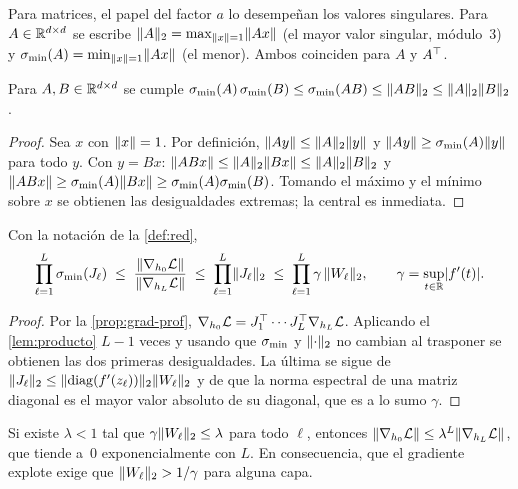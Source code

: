 Para matrices, el papel del factor $a$ lo desempeñan los valores singulares. Para $A\in\mathbb{R}^{d\times d}$ se escribe $\lVert A\rVert_2=\max_{\lVert x\rVert=1}\lVert Ax\rVert$ (el mayor valor singular, módulo~3) y $\sigma_{\min}(A)=\min_{\lVert x\rVert=1}\lVert Ax\rVert$ (el menor). Ambos coinciden para $A$ y $A^{\top}$.

\begin{lema}\label{lem:producto}
Para $A,B\in\mathbb{R}^{d\times d}$ se cumple $\sigma_{\min}(A)\,\sigma_{\min}(B)\le\sigma_{\min}(AB)\le\lVert AB\rVert_2\le\lVert A\rVert_2\lVert B\rVert_2$.
\end{lema}

\begin{proof}
Sea $x$ con $\lVert x\rVert=1$. Por definición, $\lVert Ay\rVert\le\lVert A\rVert_2\lVert y\rVert$ y $\lVert Ay\rVert\ge\sigma_{\min}(A)\lVert y\rVert$ para todo $y$. Con $y=Bx$:
$\lVert ABx\rVert\le\lVert A\rVert_2\lVert Bx\rVert\le\lVert A\rVert_2\lVert B\rVert_2$ y $\lVert ABx\rVert\ge\sigma_{\min}(A)\lVert Bx\rVert\ge\sigma_{\min}(A)\sigma_{\min}(B)$. Tomando el máximo y el mínimo sobre $x$ se obtienen las desigualdades extremas; la central es inmediata.
\end{proof}

\begin{teorema}\label{teo:cotas}
Con la notación de la \cref{def:red},
\[
\prod_{\ell=1}^{L}\sigma_{\min}(J_\ell)\;\le\;\frac{\lVert\nabla_{h_0}\mathcal{L}\rVert}{\lVert\nabla_{h_L}\mathcal{L}\rVert}\;\le\;\prod_{\ell=1}^{L}\lVert J_\ell\rVert_2\;\le\;\prod_{\ell=1}^{L}\gamma\,\lVert W_\ell\rVert_2,
\qquad \gamma=\sup_{t\in\mathbb{R}}\lvert f'(t)\rvert .
\]
\end{teorema}

\begin{proof}
Por la \cref{prop:grad-prof}, $\nabla_{h_0}\mathcal{L}=J_1^{\top}\cdots J_L^{\top}\nabla_{h_L}\mathcal{L}$. Aplicando el \cref{lem:producto} $L-1$ veces y usando que $\sigma_{\min}$ y $\lVert\cdot\rVert_2$ no cambian al trasponer se obtienen las dos primeras desigualdades. La última se sigue de $\lVert J_\ell\rVert_2\le\lVert\operatorname{diag}(f'(z_\ell))\rVert_2\lVert W_\ell\rVert_2$ y de que la norma espectral de una matriz diagonal es el mayor valor absoluto de su diagonal, que es a lo sumo $\gamma$.
\end{proof}

\begin{corolario}\label{cor:pascanu}
Si existe $\lambda<1$ tal que $\gamma\lVert W_\ell\rVert_2\le\lambda$ para todo $\ell$, entonces $\lVert\nabla_{h_0}\mathcal{L}\rVert\le\lambda^{L}\lVert\nabla_{h_L}\mathcal{L}\rVert$, que tiende a~0 exponencialmente con $L$. En consecuencia, que el gradiente explote exige que $\lVert W_\ell\rVert_2>1/\gamma$ para alguna capa.
\end{corolario}

